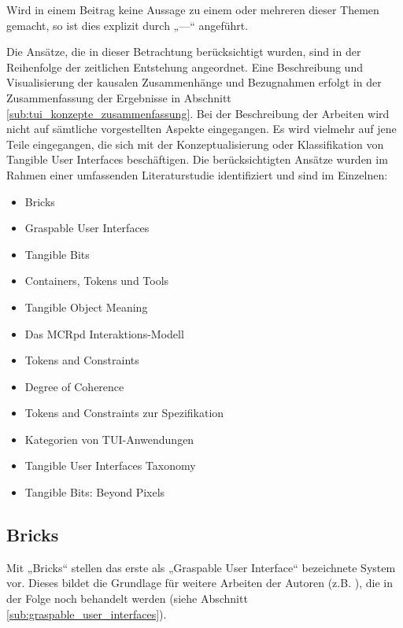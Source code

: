 Wird in einem Beitrag keine Aussage zu einem oder mehreren dieser Themen gemacht, so ist dies explizit durch „---“ angeführt.

Die Ansätze, die in dieser Betrachtung berücksichtigt wurden, sind in der Reihenfolge der zeitlichen Entstehung angeordnet. Eine Beschreibung und Visualisierung der kausalen Zusammenhänge und Bezugnahmen erfolgt in der Zusammenfassung der Ergebnisse in Abschnitt \ref{sub:tui_konzepte_zusammenfassung}. Bei der Beschreibung der Arbeiten wird nicht auf sämtliche vorgestellten Aspekte eingegangen. Es wird vielmehr auf jene Teile eingegangen, die sich mit der Konzeptualisierung oder Klassifikation von Tangible User Interfaces beschäftigen. Die berücksichtigten Ansätze wurden im Rahmen einer umfassenden Literaturstudie identifiziert und sind im Einzelnen:

    \begin{itemize}
    	\item Bricks \citep{Fitzmaurice95}
    	\item Graspable User Interfaces \citep{Fitzmaurice96}
    	\item Tangible Bits \citep{Ishii97}
    	\item Containers, Tokens und Tools \citep{Holmquist99}
		\item Tangible Object Meaning \citep{Underkoffler99}
    	\item Das MCRpd Interaktions-Modell \citep{Ullmer00}
    	\item Tokens and Constraints \citep{Ullmer02}
    	\item Degree of Coherence \citep{Koleva03}
    	\item Tokens and Constraints zur Spezifikation \citep{Shaer04}
    	\item Kategorien von \gls{TUI}-Anwendungen \citep{Klemmer04}
    	\item Tangible User Interfaces Taxonomy \citep{Fishkin04}
    	\item Tangible Bits: Beyond Pixels \citep{Ishii08}
    \end{itemize}

\subsection{Bricks} %
\label{sub:bricks}

Mit „Bricks“ stellen \citet{Fitzmaurice95} das erste als „Graspable User Interface“ bezeichnete System vor. Dieses bildet die Grundlage für weitere Arbeiten der Autoren (z.B. \citet{Fitzmaurice96}), die in der Folge noch behandelt werden (siehe Abschnitt \ref{sub:graspable_user_interfaces}). 

